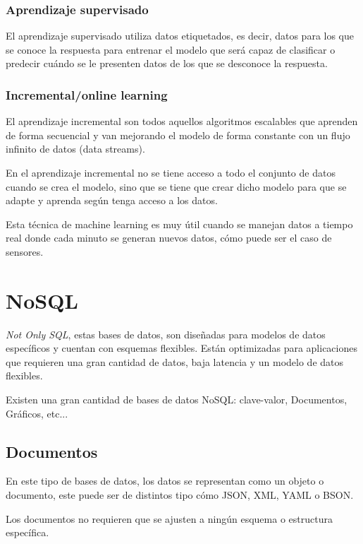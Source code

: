 \subsubsection{Aprendizaje supervisado}
El aprendizaje supervisado utiliza datos etiquetados, es decir, datos para los que se conoce la respuesta para entrenar el modelo que será capaz de clasificar o predecir cuándo se le presenten datos de los que se desconoce la respuesta. 


\subsubsection{Incremental/online learning}

El aprendizaje incremental son todos aquellos algoritmos escalables que aprenden de forma secuencial y van mejorando el modelo de forma constante con un flujo infinito de datos (data streams).

En el aprendizaje incremental no se tiene acceso a todo el conjunto de datos cuando se crea el modelo, sino que se tiene que crear dicho modelo para que se adapte y aprenda según tenga acceso a los datos. 

Esta técnica de machine learning es muy útil cuando se manejan datos a tiempo real donde cada minuto se generan nuevos datos, cómo puede ser el caso de sensores.\cite{gepperth:hal-01418129}


\section{NoSQL}

\textit{Not Only SQL}, estas bases de datos, son diseñadas para modelos de datos específicos y cuentan con esquemas flexibles. Están optimizadas para aplicaciones que requieren una gran cantidad de datos, baja latencia y un modelo de datos flexibles.

Existen una gran cantidad de bases de datos NoSQL: clave-valor, Documentos, Gráficos, etc...

\subsection{Documentos}

En este tipo de bases de datos, los datos se representan como un objeto o documento, este puede ser de distintos tipo cómo JSON, XML, YAML o BSON.\cite{pagina:AWS_NoSQL}

Los documentos no requieren que se ajusten a ningún esquema o estructura específica.

